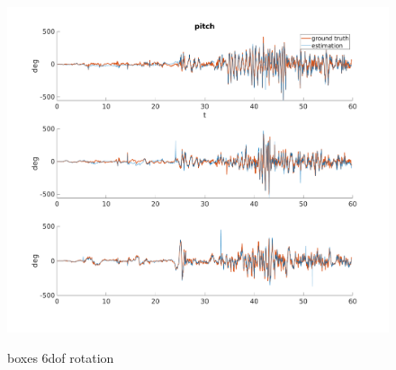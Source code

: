\begin{figure}
\centering \includegraphics[width =
\textwidth]{images/boxes_6dof_rotation_.png}
\label{fig:boxes_6dof_rotation}
\caption{boxes 6dof rotation}
\end{figure}


